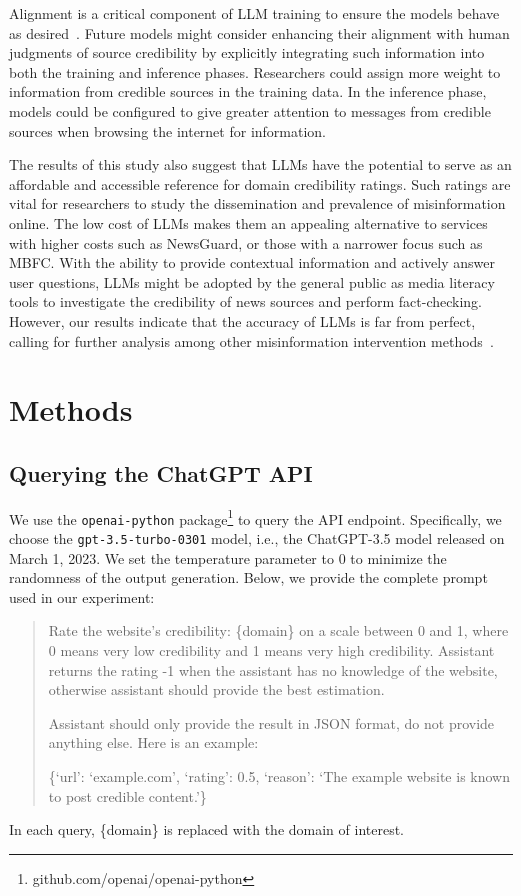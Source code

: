 \documentclass{article}
\begin{document}
Alignment is a critical component of LLM training to ensure the models behave as desired~\cite{ouyang2022training}. 
Future models might consider enhancing their alignment with human judgments of source credibility by explicitly integrating such information into both the training and inference phases.
Researchers could assign more weight to information from credible sources in the training data.
In the inference phase, models could be configured to give greater attention to messages from credible sources when browsing the internet for information.

The results of this study also suggest that LLMs have the potential to serve as an affordable and accessible reference for domain credibility ratings.
Such ratings are vital for researchers to study the dissemination and prevalence of misinformation online.
The low cost of LLMs makes them an appealing alternative to services with higher costs such as NewsGuard, or those with a narrower focus such as MBFC.
With the ability to provide contextual information and actively answer user questions, LLMs might be adopted by the general public as media literacy tools to investigate the credibility of news sources and perform fact-checking.
However, our results indicate that the accuracy of LLMs is far from perfect, calling for further analysis among other misinformation intervention methods~\cite{kozyreva2022toolbox}.

\section{Methods}

\subsection{Querying the ChatGPT API}

We use the \texttt{openai-python} package\footnote{github.com/openai/openai-python} to query the API endpoint.
Specifically, we choose the \texttt{gpt-3.5-turbo-0301} model, i.e., the ChatGPT-3.5 model released on March 1, 2023.
We set the temperature parameter to 0 to minimize the randomness of the output generation.
Below, we provide the complete prompt used in our experiment:

\begin{quote}
Rate the website's credibility: \{domain\} on a scale between 0 and 1, where 0 means very low credibility and 1 means very high credibility.
Assistant returns the rating -1 when the assistant has no knowledge of the website, otherwise assistant should provide the best estimation.

Assistant should only provide the result in JSON format, do not provide anything else.
Here is an example:

\{`url': `example.com', `rating': 0.5, `reason': `The example website is known to post credible content.'\}
\end{quote}
In each query, \{domain\} is replaced with the domain of interest.
\end{document}
